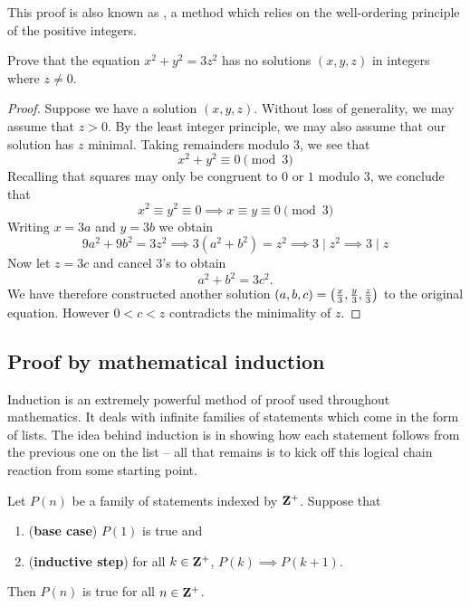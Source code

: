\begin{remark}
This proof is also known as , a method which relies on the well-ordering principle of the positive integers.
\end{remark}

\begin{exercise}{}{}
Prove that the equation $x^2+y^2=3z^2$ has no solutions $(x,y,z)$ in integers where $z\neq0$.
\end{exercise}

\begin{proof}
Suppose we have a solution $(x,y,z)$. Without loss of generality, we may assume that $z>0$. By the least integer principle, we may also assume that our solution has $z$ minimal. Taking remainders modulo $3$, we see that
\[ x^2+y^2\equiv0\pmod3 \]
Recalling that squares may only be congruent to $0$ or $1$ modulo $3$, we conclude that
\[ x^2\equiv y^2\equiv 0 \implies x \equiv y \equiv 0 \pmod 3 \]
Writing $x=3a$ and $y=3b$ we obtain
\[ 9a^2+9b^2=3z^2 \implies 3(a^2+b^2)=z^2 \implies 3\mid z^2 \implies 3\mid z \]
Now let $z=3c$ and cancel $3$'s to obtain
\[ a^2+b^2=3c^2. \]
We have therefore constructed another solution $(a,b,c)=\left(\frac{x}{3},\frac{y}{3},\frac{z}{3}\right)$ to the original equation. However $0<c<z$ contradicts the minimality of $z$.
\end{proof}

\subsection{Proof by mathematical induction}
Induction is an extremely powerful method of proof used throughout mathematics. It deals with infinite families of statements which come in the form of lists. The idea behind induction is in showing how each statement follows from the previous one on the list -- all that remains is to kick off this logical chain reaction from some starting point.

\begin{theorem}
Let $P(n)$ be a family of statements indexed by $\mathbf Z^+$. Suppose that 
\begin{enumerate}[label=(\roman*)]
\item (\textbf{base case}) $P(1)$ is true and
\item (\textbf{inductive step}) for all $k\in\mathbf Z^+$, $P(k)\implies P(k+1)$.
\end{enumerate}
Then $P(n)$ is true for all $n\in\mathbf Z^+$.
\end{theorem}

